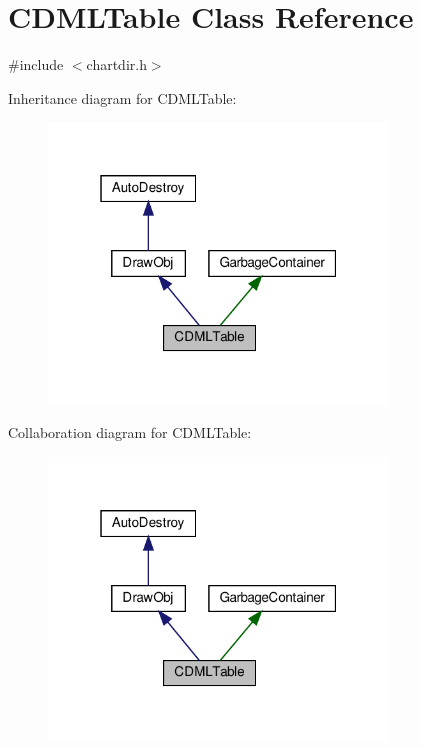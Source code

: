 \hypertarget{class_c_d_m_l_table}{}\section{C\+D\+M\+L\+Table Class Reference}
\label{class_c_d_m_l_table}


{\ttfamily \#include $<$chartdir.\+h$>$}



Inheritance diagram for C\+D\+M\+L\+Table\+:
\nopagebreak
\begin{figure}[H]
\begin{center}
\leavevmode
\includegraphics[width=256pt]{class_c_d_m_l_table__inherit__graph}
\end{center}
\end{figure}


Collaboration diagram for C\+D\+M\+L\+Table\+:
\nopagebreak
\begin{figure}[H]
\begin{center}
\leavevmode
\includegraphics[width=256pt]{class_c_d_m_l_table__coll__graph}
\end{center}
\end{figure}
